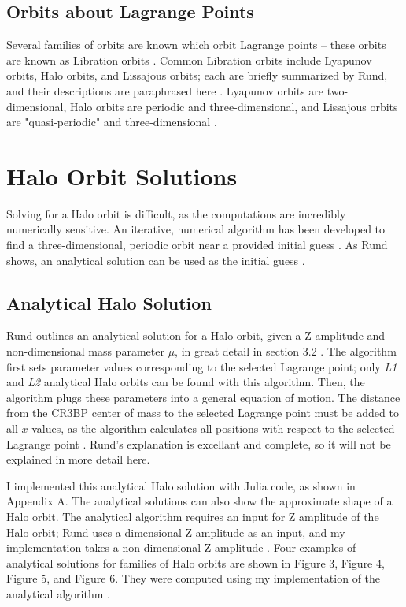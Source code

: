 \documentclass[conf]{new-aiaa}
\begin{document}
\begin{multicols}{2}
\subsection{Orbits about Lagrange Points}
Several families of orbits are known which orbit Lagrange points -- these orbits
are known as Libration orbits \cite{rund2018interplanetary}. Common Libration
orbits include Lyapunov orbits, Halo orbits, and Lissajous orbits; each are briefly 
summarized by Rund, and their descriptions are paraphrased here \cite{rund2018interplanetary}.
Lyapunov orbits are two-dimensional, Halo orbits are periodic and three-dimensional, 
and Lissajous orbits are "quasi-periodic" and three-dimensional 
\cite{rund2018interplanetary}.

\section{Halo Orbit Solutions}
Solving for a Halo orbit is difficult, as the computations are incredibly numerically 
sensitive. An iterative, numerical algorithm has been developed to find a three-dimensional, 
periodic orbit near a provided initial guess \cite{rund2018interplanetary} \cite{howell1984three}.
As Rund shows, an analytical solution can be used as the initial guess \cite{rund2018interplanetary}.

\subsection{Analytical Halo Solution}
Rund outlines an analytical solution for a Halo orbit, given a Z-amplitude and 
non-dimensional mass parameter $\mu$, in great detail in section 3.2 \cite{rund2018interplanetary}.
The algorithm first sets parameter values corresponding to the selected Lagrange point; 
only \textit{L1} and \textit{L2} analytical Halo orbits can be found with this algorithm.
Then, the algorithm plugs these parameters into a general equation of motion. The distance 
from the CR3BP center of mass to the selected Lagrange point must be added to all $x$ values, 
as the algorithm calculates all positions with respect to the selected Lagrange point 
\cite{rund2018interplanetary}.
Rund's explanation is excellant and complete, so it will not be explained in more detail here. 

I implemented this analytical Halo solution with Julia code, as shown in Appendix A.
The analytical solutions can also show the approximate shape of a Halo orbit. The analytical 
algorithm requires an input for Z amplitude of the Halo orbit; 
Rund uses a dimensional Z amplitude as an input, 
and my implementation takes a non-dimensional Z amplitude \cite{rund2018interplanetary}. 
Four examples of analytical solutions for families of Halo orbits are shown in Figure 3, 
Figure 4, Figure 5, and Figure 6. They were computed using my implementation of 
the analytical algorithm \cite{rund2018interplanetary}.

\end{multicols}
\end{document}
